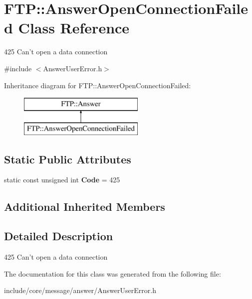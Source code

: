 \hypertarget{class_f_t_p_1_1_answer_open_connection_failed}{\section{F\-T\-P\-:\-:Answer\-Open\-Connection\-Failed Class Reference}
\label{class_f_t_p_1_1_answer_open_connection_failed}
}


425 Can't open a data connection  




{\ttfamily \#include $<$Answer\-User\-Error.\-h$>$}

Inheritance diagram for F\-T\-P\-:\-:Answer\-Open\-Connection\-Failed\-:\begin{figure}[H]
\begin{center}
\leavevmode
\includegraphics[height=2.000000cm]{class_f_t_p_1_1_answer_open_connection_failed}
\end{center}
\end{figure}
\subsection*{Static Public Attributes}
\begin{DoxyCompactItemize}
\item 
\hypertarget{class_f_t_p_1_1_answer_open_connection_failed_ab58e3bd133a6b97fcf460bd0ea4550d7}{static const unsigned int {\bfseries Code} = 425}\label{class_f_t_p_1_1_answer_open_connection_failed_ab58e3bd133a6b97fcf460bd0ea4550d7}

\end{DoxyCompactItemize}
\subsection*{Additional Inherited Members}


\subsection{Detailed Description}
425 Can't open a data connection 

The documentation for this class was generated from the following file\-:\begin{DoxyCompactItemize}
\item 
include/core/message/answer/Answer\-User\-Error.\-h\end{DoxyCompactItemize}
